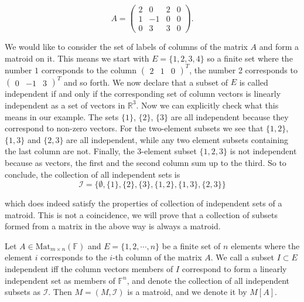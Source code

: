 $$A = \begin{pmatrix}

2 & 0 & 2 & 0 \\
1 & -1 & 0 & 0 \\
0 & 3 & 3 & 0


\end{pmatrix}.$$

We would like to consider the set of labels of columns of the matrix $A$ and form a matroid on it. This means we start with $E = \{1,2,3,4\}$ so a finite set where the number $1$ corresponds to the column $\begin{pmatrix} 2 & 1 & 0 \end{pmatrix} ^ T$, the number 2 corresponds to $\begin{pmatrix}  0 & -1 & 3  \end{pmatrix} ^ T$ and so forth. We now declare that a subset of $E$ is called independent if and only if the corresponding set of column vectors is linearly independent as a set of vectors in $\mathbb{R}^3$. Now we can explicitly check what this means in our example. The sets $\{1\}$, $\{2\}$, $\{3\}$ are all independent because they correspond to non-zero vectors. For the two-element subsets we see that $\{1,2\}$, $\{1,3\}$ and $\{2,3\}$ are all independent, while any two element subsets containing the last column are not. Finally, the 3-element subset $\{1,2,3\}$ is not independent because as vectors, the first and the second column sum up to the third. So to conclude, the collection of all independent sets is
$$\mathcal{I} = \{\emptyset, \{1\}, \{2\}, \{3\}, \{1,2\}, \{1,3\}, \{2,3\} \}$$

which does indeed satisfy the properties of collection of independent sets of a matroid. This is not a coincidence, we will prove that a collection of subsets formed from a matrix in the above way is always a matroid.

\begin{theorem}

    Let $A \in \mathrm{Mat} _{m \times n}(\mathbb{F})$ and $E = \{1, 2, \cdots, n\}$ be a finite set of $n$ elements where the element $i$ corresponds to the $i$-th column of the matrix $A$. We call a subset $I \subset E$ independent iff the column vectors members of $I$ correspond to form a linearly independent set as members of $\mathbb{F}^n$, and denote the collection of all independent subsets as $\mathcal{I}$. Then $M = (M, \mathcal{I})$ is a matroid, and we denote it by $M[A]$.
    
\end{theorem}

